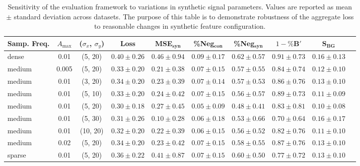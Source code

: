 \begin{table}[h]
\centering
\small
\begin{tabular}{lccccccccr}
\hline
Samp. Freq. & $A_{\mathrm{max}}$  & ($\sigma_x$, $\sigma_y$) & Loss & MSE$_{\mathbf{syn}}$ & \%Neg$_{\mathbf{con}}$ & \%Neg$_{\mathbf{syn}}$ & $1-\%\mathbf{B}'$ & $\mathbf{S}_{\mathbf{BG}}$ \\
\hline
dense & 0.01 & (5, 20) & $0.40 \pm 0.26$ & $0.46 \pm 0.94$ & $0.09 \pm 0.17$ & $0.62 \pm 0.57$ & $0.91 \pm 0.73$ & $0.16 \pm 0.13$  \\
medium & 0.005 & (5, 20) & $0.33 \pm 0.20$ & $0.21 \pm 0.38$ & $0.07 \pm 0.15$ & $0.57 \pm 0.55$ & $0.84 \pm 0.74$ & $0.12 \pm 0.10$ \\
medium & 0.01 & (3, 20) & $0.34 \pm 0.20$ & $0.23 \pm 0.39$ & $0.07 \pm 0.14$ & $0.57 \pm 0.53$ & $0.86 \pm 0.76$ & $0.13 \pm 0.10$ \\
medium & 0.01 & (5, 10) & $0.33 \pm 0.20$ & $0.24 \pm 0.42$ & $0.07 \pm 0.15$ & $0.56 \pm 0.57$ & $0.89 \pm 0.73$ & $0.11 \pm 0.09$ \\
medium & 0.01 & (5, 20) & $0.30 \pm 0.18$ & $0.27 \pm 0.45$ & $0.05 \pm 0.09$ & $0.48 \pm 0.41$ & $0.83 \pm 0.81$ & $0.10 \pm 0.08$ \\
medium & 0.01 & (5, 30) & $0.31 \pm 0.26$ & $0.10 \pm 0.28$ & $0.06 \pm 0.18$ & $0.53 \pm 0.66$ & $0.70 \pm 0.64$ & $0.16 \pm 0.17$ \\
medium & 0.01 & (10, 20) & $0.32 \pm 0.20$ & $0.22 \pm 0.39$ & $0.06 \pm 0.15$ & $0.56 \pm 0.52$ & $0.82 \pm 0.76$ & $0.11 \pm 0.10$ \\
medium & 0.02 & (5, 20) & $0.34 \pm 0.20$ & $0.23 \pm 0.42$ & $0.07 \pm 0.15$ & $0.58 \pm 0.55$ & $0.87 \pm 0.76$ & $0.13 \pm 0.10$ \\
sparse & 0.01 & (5, 20) & $0.36 \pm 0.22$ & $0.41 \pm 0.87$ & $0.07 \pm 0.15$ & $0.60 \pm 0.50$ & $0.77 \pm 0.72$ & $0.13 \pm 0.10$ \\
\hline
\end{tabular}
\caption{Sensitivity of the evaluation framework to variations in synthetic signal parameters. Values are reported as mean $\pm$ standard deviation across datasets. The purpose of this table is to demonstrate robustness of the aggregate loss to reasonable changes in synthetic feature configuration.}
\label{tab:synthetic_variations}
\end{table}



